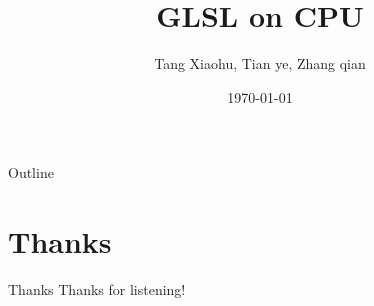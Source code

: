 \documentclass{beamer}
\title[]{GLSL on CPU}
\author{Tang Xiaohu, Tian ye, Zhang qian}
\date{\today}
\begin{document}
\begin{frame}
  \titlepage
\end{frame}

\begin{frame}{Outline}
 \tableofcontents
\end{frame}









\section{Thanks}
\begin{frame}{Thanks}
  Thanks for listening!
\end{frame}
\end{document}
